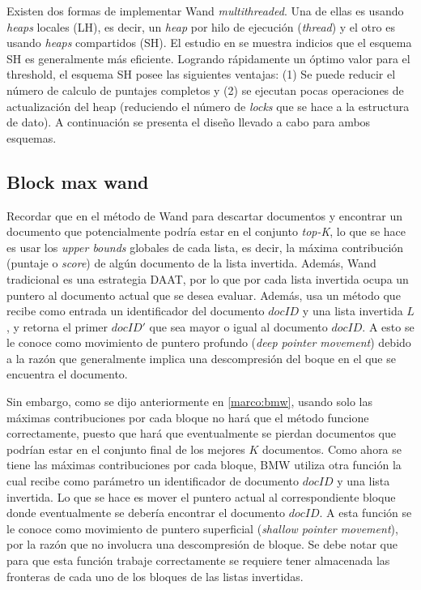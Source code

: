 Existen dos formas de implementar Wand \textit{multithreaded}. Una de ellas es usando \textit{heaps} locales (LH), es decir, un \textit{heap} por hilo de ejecución (\textit{thread}) y el otro es usando \textit{heaps} compartidos (SH). El estudio en \citep{Rojas:2013} se muestra indicios que el esquema SH es generalmente más eficiente. Logrando rápidamente un óptimo valor para el threshold, el esquema SH posee las siguientes ventajas: (1) Se puede reducir el número de calculo de puntajes completos y (2) se ejecutan pocas operaciones de actualización del heap (reduciendo el número de \textit{locks} que se hace a la estructura de dato). A continuación se presenta el diseño llevado a cabo para ambos esquemas.

\subsection{Block max wand}
Recordar que en el método de Wand para descartar documentos y encontrar un documento que potencialmente podría estar en el conjunto \textit{top-K}, lo que se hace es usar los \textit{upper bounds} globales de cada lista, es decir, la máxima contribución (puntaje o \textit{score}) de algún documento de la lista invertida. Además, Wand tradicional es una estrategia DAAT, por lo que por cada lista invertida ocupa un puntero al documento actual que se desea evaluar. Además, usa un método que recibe como entrada un identificador del documento $docID$ y una lista invertida $L$, y retorna el primer $docID'$ que sea mayor o igual al documento $docID$. A esto se le conoce como movimiento de puntero profundo (\textit{deep pointer movement}) debido a la razón que generalmente implica una descompresión del boque en el que se encuentra el documento.

Sin embargo, como se dijo anteriormente en \ref{marco:bmw}, usando solo las máximas contribuciones por cada bloque no hará que el método funcione correctamente, puesto que hará que eventualmente se pierdan documentos que podrían estar en el conjunto final de los mejores $K$ documentos. Como ahora se tiene las máximas contribuciones por cada bloque, BMW utiliza otra función la cual recibe como parámetro un identificador de documento $docID$ y una lista invertida. Lo que se hace es mover el puntero actual al correspondiente bloque donde eventualmente se debería encontrar el documento $docID$. A esta función se le conoce como movimiento de puntero superficial (\textit{shallow pointer movement}), por la razón que no involucra una descompresión de bloque. Se debe notar que para que esta función trabaje correctamente se requiere tener almacenada las fronteras de cada uno de los bloques de las listas invertidas.

